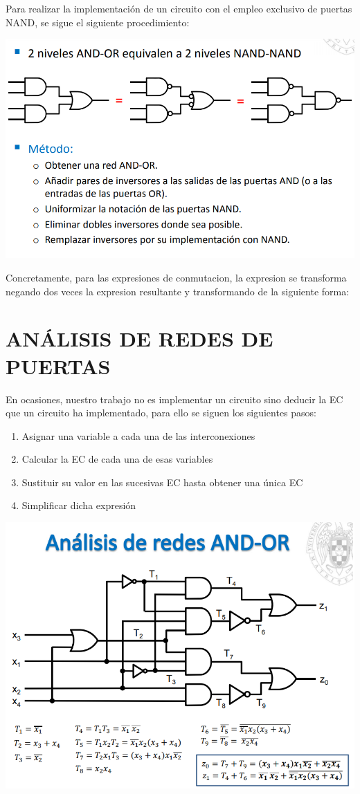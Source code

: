 \documentclass[a4paper,10pt]{book}
\begin{document}
Para realizar la implementación de un circuito con el empleo exclusivo de puertas NAND, se sigue el siguiente procedimiento:

\begin{center}
\includegraphics[scale=0.35]{imp en NAND}
\end{center}

Concretamente, para las expresiones de conmutacion, la expresion se transforma negando dos veces la expresion resultante y transformando de la siguiente forma:

\section*{ANÁLISIS DE REDES DE PUERTAS}
En ocasiones, nuestro trabajo no es implementar un circuito sino deducir la EC que un circuito ha implementado, para ello se siguen los siguientes pasos:
\begin{enumerate}
\item Asignar una variable a cada una de las interconexiones
\item Calcular la EC de cada una de esas variables
\item Sustituir su valor en las sucesivas EC hasta obtener una única EC
\item Simplificar dicha expresión
\end{enumerate}

\begin{center}
\includegraphics[scale=0.45]{analisis puertas}
\end{center}
\end{document}
